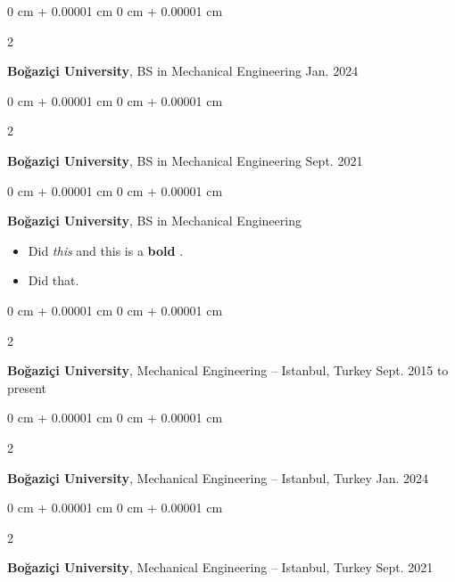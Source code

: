 \documentclass[10pt, letterpaper]{article}
\newenvironment{highlights}{
    \begin{itemize}[
        topsep=0.10 cm,
        parsep=0.10 cm,
        partopsep=0pt,
        itemsep=0pt,
        leftmargin=0 cm + 10pt
    ]
}{
    \end{itemize}
} %
\newenvironment{onecolentry}{
    \begin{adjustwidth}{
        0 cm + 0.00001 cm
    }{
        0 cm + 0.00001 cm
    }
}{
    \end{adjustwidth}
} %
\newenvironment{twocolentry}[2][]{
    \onecolentry
    \def\secondColumn{#2}
    \setcolumnwidth{\fill, 4.2cm}
    \begin{paracol}{2}
}{
    \switchcolumn \raggedleft \secondColumn
    \end{paracol}
    \endonecolentry
} %
\let\hrefWithoutArrow\href
\renewcommand{\href}[2]{\hrefWithoutArrow{#1}{\mbox{\ifthenelse{\equal{#2}{}}{ }{#2 }\raisebox{.15ex}{\footnotesize \faExternalLink*}}}}
\begin{document}
        \begin{twocolentry}{
            Jan. 2024
        }
            \textbf{Boğaziçi University}, BS in Mechanical Engineering\end{twocolentry}


        \vspace{0.1 cm}

        \begin{twocolentry}{
            Sept. 2021
        }
            \textbf{Boğaziçi University}, BS in Mechanical Engineering\end{twocolentry}


        \vspace{0.1 cm}

        \begin{onecolentry}
            \textbf{Boğaziçi University}, BS in Mechanical Engineering    \begin{highlights}
                \item Did \textit{this} and this is a \textbf{bold} \href{https://example.com}{link}.
                \item Did that.
            \end{highlights}
        \end{onecolentry}


        \vspace{0.1 cm}

        \begin{twocolentry}{
            Sept. 2015 to present
        }
            \textbf{Boğaziçi University}, Mechanical Engineering -- Istanbul, Turkey\end{twocolentry}


        \vspace{0.1 cm}

        \begin{twocolentry}{
            Jan. 2024
        }
            \textbf{Boğaziçi University}, Mechanical Engineering -- Istanbul, Turkey\end{twocolentry}


        \vspace{0.1 cm}

        \begin{twocolentry}{
            Sept. 2021
        }
            \textbf{Boğaziçi University}, Mechanical Engineering -- Istanbul, Turkey\end{twocolentry}


        \vspace{0.1 cm}
\end{document}
